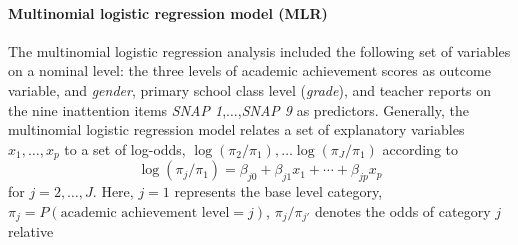 \documentclass[10pt,letterpaper]{article}
\begin{document}
\paragraph{Multinomial logistic regression model (MLR)}
The multinomial logistic regression analysis included the following set of variables on a nominal level: the three levels of academic achievement scores as outcome variable, and 
 {\it gender}, primary school class level ({\it grade}), and  teacher reports on the nine inattention items {\it SNAP 1},$\ldots$,{\it SNAP 9} as predictors. 
Generally, the multinomial logistic regression model relates a set of explanatory variables $x_1, \ldots, x_p$ to a set of log-odds, $\log(\pi_2/\pi_1), \ldots \log(\pi_J/\pi_1)$ according to
\begin{equation}
\label{eq_MLR}
\log(\pi_j/\pi_1) = \beta_{j0} + \beta_{j1} x_1 + \cdots + \beta_{jp} x_p
\end{equation}
for $j=2,\ldots,J$. Here, $j = 1$ represents the base level category, $\pi_j = P(\mbox{academic achievement level} = j)$, $\pi_j/\pi_{j'}$ denotes the odds of category $j$ relative 
\end{document}
